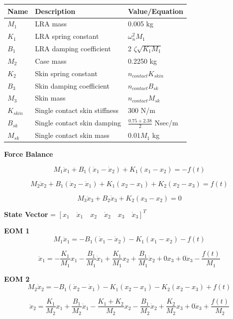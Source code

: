 \documentclass[letterpaper,11pt]{article}
\begin{document}
\begin{table}[h]
\centering
\begin{tabular}{|l|l|l|}
\hline
\textbf{Name} & \textbf{Description} & \textbf{Value/Equation} \\
\hline
$M_1$ & LRA mass & 0.005 kg \\
\hline
$K_1$ & LRA spring constant & $\omega_n^2 M_1$\\
\hline
$B_1$ & LRA damping coefficient & 2 $\zeta   \sqrt{K_1 M_1}$ \\
\hline
$M_2$ & Case mass & 0.2250 kg \\
\hline
$K_2$ & Skin spring constant & $n_{contact}   K_{skin}$ \\
\hline
$B_3$ & Skin damping coefficient & $n_{contact}   B_{sk}$ \\
\hline
$M_3$ & Skin mass & $n_{contact}   M_{sk}$ \\
\hline
$K_{skin}$ & Single contact skin stiffness & 300 N/m \\
\hline
$B_{sk}$ & Single contact skin damping & $\frac{0.75 + 2.38}{2}$ Nsec/m \\
\hline
$M_{sk}$ & Single contact skin mass & $0.01M_1$ kg \\
\hline
\end{tabular}
\end{table}


\noindent \textbf{Force Balance}

\[
M_1 \ddot{x}_1 + B_1(\dot{x}_1 - \dot{x}_2) + K_1(x_1 - x_2) = -f(t)
\]

\[
M_2 \ddot{x}_2 + B_1(\dot{x}_2 - \dot{x}_1) + K_1(x_2 - x_1) + K_2(x_2 - x_3) = f(t)
\]

\[
M_3 \ddot{x}_3 + B_2 \dot{x}_3 + K_2(x_3 - x_2) = 0
\]

\noindent \textbf{State Vector} = $[x_1 \quad \dot{x}_1 \quad x_2 \quad \dot{x}_2 \quad x_3 \quad \dot{x}_3]^T$

\noindent \textbf{EOM 1}
\[
M_1 \ddot{x}_1 = -B_1(\dot{x}_1 - \dot{x}_2) - K_1(x_1 - x_2) - f(t)
\]

\[
\ddot{x}_1 = -\frac{K_1}{M_1} x_1 - \frac{B_1}{M_1} \dot{x}_1 + \frac{K_1}{M_1} x_2 + \frac{B_1}{M_1} \dot{x}_2 + 0   x_3 + 0   \dot{x}_3 - \frac{f(t)}{M_1}
\]

\noindent \textbf{EOM 2}
\[
M_2 \ddot{x}_2 = -B_1(\dot{x}_2 - \dot{x}_1) - K_1(x_2 - x_1) - K_2(x_2 - x_3) + f(t)
\]

\[
\ddot{x}_2 = \frac{K_1}{M_2} x_1 + \frac{B_1}{M_2} \dot{x}_1 - \frac{K_1 + K_2}{M_2} x_2 - \frac{B_1}{M_2} \dot{x}_2 + \frac{K_2}{M_2} x_3 + 0   \dot{x}_3 + \frac{f(t)}{M_2}
\]
\end{document}
